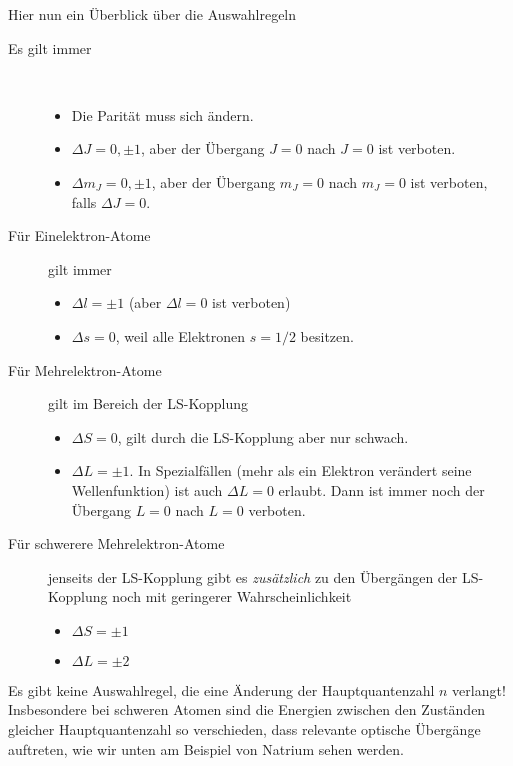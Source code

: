 Hier nun ein Überblick über die Auswahlregeln
\begin{description}
    \item[Es gilt immer] \ \\
\begin{itemize}\setlength{\itemsep}{0pt}
    \item Die Parität muss sich ändern.
    \item $\Delta J = 0, \pm 1$, aber der Übergang $J=0$ nach $J=0$ ist verboten.
    \item $\Delta m_J = 0, \pm 1$, aber der Übergang $m_J=0$ nach $m_J=0$ ist verboten, falls $\Delta J = 0$.
\end{itemize}

\item[Für Einelektron-Atome]  gilt immer  \ \\
\begin{itemize}\setlength{\itemsep}{0pt}
    \item  $\Delta l = \pm 1$ (aber  $\Delta l = 0$ ist verboten)
    \item $\Delta s = 0$, weil alle Elektronen $s=1/2$ besitzen.
\end{itemize}

\item[Für Mehrelektron-Atome] gilt im Bereich der LS-Kopplung   \ \\  
\begin{itemize}\setlength{\itemsep}{0pt}
    \item $\Delta S = 0$, gilt durch die LS-Kopplung aber nur schwach.
    \item $\Delta L = \pm 1$. In Spezialfällen (mehr als ein Elektron verändert seine Wellenfunktion) ist auch $\Delta L = 0$ erlaubt. Dann ist immer noch der Übergang $L=0$ nach $L=0$  verboten.
\end{itemize}

\item[Für schwerere Mehrelektron-Atome]  jenseits  der LS-Kopplung gibt es \emph{zusätzlich} zu den Übergängen der LS-Kopplung noch mit geringerer Wahrscheinlichkeit    
\begin{itemize}\setlength{\itemsep}{0pt}
    \item $\Delta S  = \pm 1$
    \item $\Delta L =  \pm 2$ 
\end{itemize}
\end{description}

Es gibt keine Auswahlregel, die eine Änderung der Hauptquantenzahl $n$ verlangt! Insbesondere bei schweren Atomen sind die Energien zwischen den Zuständen gleicher Hauptquantenzahl so verschieden, dass relevante optische Übergänge auftreten, wie wir unten am Beispiel von Natrium sehen werden.

